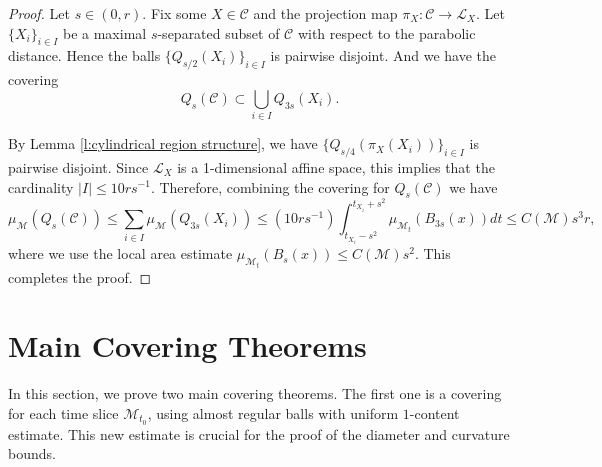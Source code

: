 \documentclass[11pt,reqno]{amsart}
\numberwithin{equation}{section}
\newcommand{\cC}{\mathcal{C}}
\newcommand{\cL}{\mathcal{L}}
\newcommand{\cM}{\mathcal{M}}
\theoremstyle{definition}
\theoremstyle{remark}
\theoremstyle{remark}
\theoremstyle{remark}
\theoremstyle{remark}\newtheorem{conjecture}[equation]{Conjecture}
\theoremstyle{remark}\newtheorem{question}[equation]{Question}
\begin{document}
\begin{proof}
    Let $s\in (0,r)$. Fix some $X\in \cC$ and the projection map $\pi_X : \cC \to \cL_X$. Let $\{X_i\}_{i \in I}$ be a maximal $s$-separated subset of $\cC$ with respect to the parabolic distance. Hence the balls $\{Q_{s/2}(X_i)\}_{i \in I}$ is pairwise disjoint. And we have the covering
    \begin{equation*}
        Q_{s}(\cC) \subset \bigcup_{i \in I} Q_{3s}(X_i).
    \end{equation*}

    By Lemma \ref{l:cylindrical region structure}, we have $\{Q_{s/4}(\pi_X(X_i))\}_{i \in I}$ is pairwise disjoint. Since $\cL_X$ is a 1-dimensional affine space, this implies that the cardinality $|I| \le 10rs^{-1}$. Therefore, combining the covering for $Q_s(\cC)$ we have
    \begin{equation*}
        \mu_{\cM}(Q_s(\cC)) \le \sum_{i \in I} \mu_{\cM}(Q_{3s}(X_i)) \le (10rs^{-1}) \int_{t_{X_i}-s^2}^{t_{X_i}+s^2} \mu_{\cM_t}(B_{3s}(x)) dt \le C(\cM) s^3 r,
    \end{equation*}
    where we use the local area estimate $\mu_{\cM_t}(B_s(x)) \le C(\cM)s^2$. 
    This completes the proof.
\end{proof}




















\section{Main Covering Theorems}





In this section, we prove two main covering theorems. The first one is a covering for each time slice $\cM_{t_0}$, using almost regular balls with uniform $1$-content estimate. This new estimate is crucial for the proof of the diameter and curvature bounds.
\end{document}
